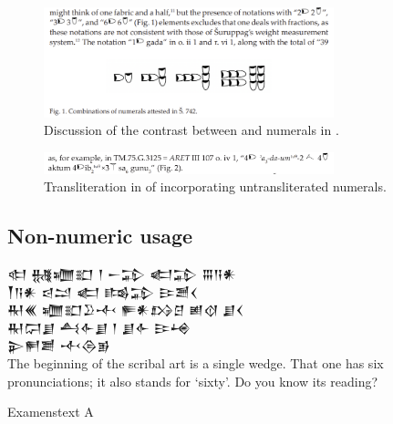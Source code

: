 \documentclass[10pt, a4paper, twoside]{article}
\newcommand\oneAšC{{\proposalfont\symbol{"12550}}} %
\newcommand\oneDišC{{\proposalfont\symbol{"12559}}}
\newcommand{\recto}{\emph{recto}}
\begin{document}
\begin{figure}
  \begin{center}
  \includegraphics[width=0.75\textwidth]{gori-162.png}
  \caption{Discussion of the contrast between {\oneAšC} and {\oneDišC} numerals in \cite[162]{Gori2023}.\label{gori162}}
  \end{center}
\end{figure}

\begin{figure}
  \begin{center}
  \includegraphics[width=0.75\textwidth]{gori-163.png}
  \caption{Transliteration in \cite[163]{Gori2023} of \cite[\href{http://ebda.cnr.it/tablet/view/217\#13705}{\recto~4, 1}]{P242293} incorporating untransliterated numerals.\label{GoriTransliteration}}
  \end{center}
\end{figure}

\subsection{Non-numeric usage}\label{non-numeric}
\epigraph{
{\nafont 𒊕 𒉆𒁾𒊬 𒁹 𒀸𒁉 \hfill 𒅗𒁉 𒐋𒀀𒀭\\
    \hspace*{2em} 𒐕𒀀𒀭 𒁀𒁺 \hfill 𒅗 𒌤𒁉 𒄿𒍪𒌋}\\
{\nafont 𒊑𒌍 𒁾𒊬𒊒𒋾 𒊓𒀭𒋳𒆪 𒅖𒋼 \hfill 𒋗𒌋 \\
    \hspace*{2em} 𒊑𒁶𒋗 𒋀𒅆𒋗 \hfill 𒁹 𒋗𒅆 𒄿𒆲 \\
    \hspace*{2em} 𒉌𒂍𒋢 \hfill 𒋾𒁲𒂊}\\
{The beginning of the scribal art is a single wedge.
That one has six pronunciations;
it also stands for `sixty'\footnotemark. Do you know its reading\footnotemark?}}{Examenstext A}
\addtocounter{footnote}{-1}
\end{document}

